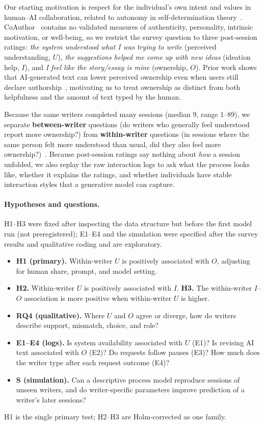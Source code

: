 \documentclass[10pt]{article}
\begin{document}
Our starting motivation is respect for the individual's own intent and values in human--AI collaboration, related to autonomy in self-determination theory~\cite{ryan2000sdt}.
CoAuthor~\cite{lee2022coauthor} contains no validated measures of authenticity, personality, intrinsic motivation, or well-being, so we restrict the survey question to three post-session ratings: \emph{the system understood what I was trying to write} (perceived understanding, $U$), \emph{the suggestions helped me come up with new ideas} (ideation help, $I$), and \emph{I feel like the story/essay is mine} (ownership, $O$).
Prior work shows that AI-generated text can lower perceived ownership even when users still declare authorship~\cite{draxler2024ghostwriter}, motivating us to treat ownership as distinct from both helpfulness and the amount of text typed by the human.

Because the same writers completed many sessions (median 9, range 1--89), we separate \textbf{between-writer} questions (do writers who generally feel understood report more ownership?) from \textbf{within-writer} questions (in sessions where the same person felt more understood than usual, did they also feel more ownership?)~\cite{curran2011disaggregation}.
Because post-session ratings say nothing about \emph{how} a session unfolded, we also replay the raw interaction logs to ask what the process looks like, whether it explains the ratings, and whether individuals have stable interaction styles that a generative model can capture.

\paragraph{Hypotheses and questions.} H1--H3 were fixed after inspecting the data structure but before the first model run (not preregistered); E1--E4 and the simulation were specified after the survey results and qualitative coding and are exploratory.
\begin{itemize}
  \item \textbf{H1 (primary).} Within-writer $U$ is positively associated with $O$, adjusting for human share, prompt, and model setting.
  \item \textbf{H2.} Within-writer $U$ is positively associated with $I$.\quad
        \textbf{H3.} The within-writer $I$--$O$ association is more positive when within-writer $U$ is higher.
  \item \textbf{RQ4 (qualitative).} Where $U$ and $O$ agree or diverge, how do writers describe support, mismatch, choice, and role?
  \item \textbf{E1--E4 (logs).} Is system availability associated with $U$ (E1)? Is revising AI text associated with $O$ (E2)? Do requests follow pauses (E3)? How much does the writer type after each request outcome (E4)?
  \item \textbf{S (simulation).} Can a descriptive process model reproduce sessions of unseen writers, and do writer-specific parameters improve prediction of a writer's later sessions?
\end{itemize}
H1 is the single primary test; H2--H3 are Holm-corrected as one family.
\end{document}
